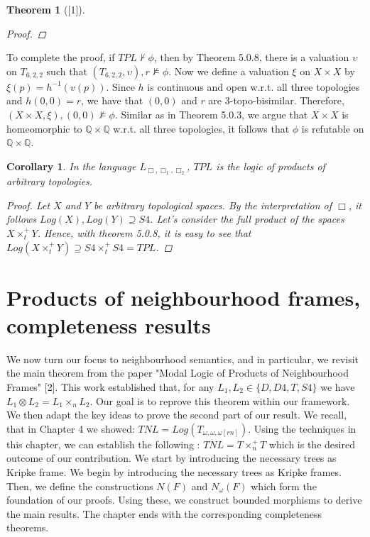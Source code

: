 \documentclass[12pt, a4paper]{scrartcl}
\newtheorem{corollary}[definition]{Corollary}
\newtheorem{theorem}[definition]{Theorem}
\begin{document}
\begin{theorem}[\textnormal{[1]}]
\begin{proof}
    \end{proof}

\end{theorem}

To complete the proof, if $\mathit{TPL} \nvdash \phi$, then by Theorem 5.0.8, there is a 
valuation $\upsilon$ on $T_{6,2,2}$ such that $(T_{6,2,2}, \upsilon), r \nvDash \phi$. Now we define a valuation $\xi$
on $X \times X$ by $\xi(p) = h^{-1}(v(p))$. Since $h$ is continuous and open w.r.t. all three topologies and $h(0,0) = r$,
we have that $(0,0)$ and $r$ are 3-topo-bisimilar. Therefore, $(X \times X, \xi),(0,0) \nvDash \phi$. Similar as in Theorem 5.0.3, we argue
that $X \times X$ is homeomorphic to $\mathbb{Q} \times \mathbb{Q}$ w.r.t. all three topologies, it follows that $\phi$ is refutable on $\mathbb{Q} \times \mathbb{Q}$.

\begin{corollary}
    In the language $L_{\Box, \Box_1, \Box_2}$, $\mathit{TPL}$ is the logic of products of arbitrary topologies.
    \begin{proof}
        Let $X$ and $Y$ be arbitrary topological spaces. By the interpretation of $\Box$, it follows
        $Log(X), Log(Y) \supseteq S4$. Let's consider the full product of the spaces $X \times^+_t Y$.
        Hence, with theorem 5.0.8, it is easy to see that $Log(X \times^+_t Y) \supseteq S4 \times^+_t S4 = \mathit{TPL}$.

    \end{proof}

\end{corollary}

\clearpage

\section{Products of neighbourhood frames, completeness results}
We now turn our focus to neighbourhood semantics, and in particular, we revisit the main theorem from the paper "Modal Logic of Products of Neighbourhood Frames" [2]. This work established that, for any $L_1, L_2 \in \{D,D4,T,S4\}$ we have
$L_1 \otimes L_2 = L_1 \times_n L_2$.
Our goal is to reprove this theorem within our framework. We then adapt the key ideas to prove the second part of our result.
We recall, that 
in Chapter 4 we showed: $\mathit{TNL} = Log(T_{\omega,\omega,\omega[rn]})$. Using the techniques in this chapter, we can
establish the following : $\mathit{TNL} = T \times^+_n T$ which is the desired outcome of our contribution.
\newline
We start by introducing the necessary trees as Kripke frame. We begin by introducing the necessary trees as Kripke frames. Then, we define the constructions 
$N(F)$ and $N_\omega(F)$ which form the foundation of our proofs. 
Using these, we construct bounded morphisms to derive the main results. The chapter ends with the corresponding completeness theorems.
\end{document}
